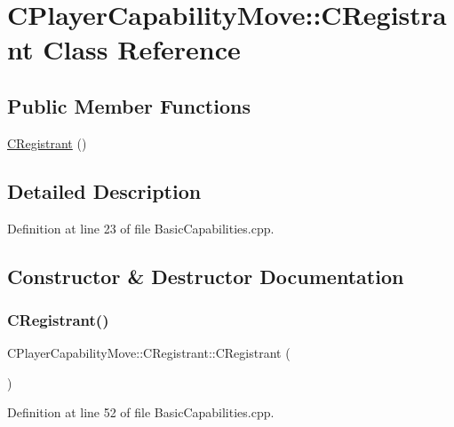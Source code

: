 \hypertarget{classCPlayerCapabilityMove_1_1CRegistrant}{}\section{C\+Player\+Capability\+Move\+:\+:C\+Registrant Class Reference}
\label{classCPlayerCapabilityMove_1_1CRegistrant}
\subsection*{Public Member Functions}
\begin{DoxyCompactItemize}
\item 
\hyperlink{classCPlayerCapabilityMove_1_1CRegistrant_a9ee42fd2028701745555195a2e35922b}{C\+Registrant} ()
\end{DoxyCompactItemize}


\subsection{Detailed Description}


Definition at line 23 of file Basic\+Capabilities.\+cpp.



\subsection{Constructor \& Destructor Documentation}
\hypertarget{classCPlayerCapabilityMove_1_1CRegistrant_a9ee42fd2028701745555195a2e35922b}{}\label{classCPlayerCapabilityMove_1_1CRegistrant_a9ee42fd2028701745555195a2e35922b} 
\subsubsection{\texorpdfstring{C\+Registrant()}{CRegistrant()}}
{\footnotesize\ttfamily C\+Player\+Capability\+Move\+::\+C\+Registrant\+::\+C\+Registrant (\begin{DoxyParamCaption}{ }\end{DoxyParamCaption})}



Definition at line 52 of file Basic\+Capabilities.\+cpp.



